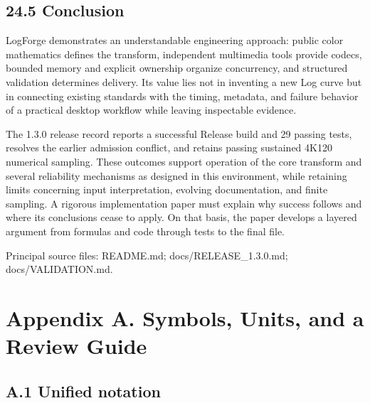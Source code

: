 \documentclass[11pt,a4paper,openany]{book}
\begin{document}
\section*{24.5 Conclusion}
LogForge demonstrates an understandable engineering approach: public color mathematics defines the transform, independent multimedia tools provide codecs, bounded memory and explicit ownership organize concurrency, and structured validation determines delivery. Its value lies not in inventing a new Log curve but in connecting existing standards with the timing, metadata, and failure behavior of a practical desktop workflow while leaving inspectable evidence.

The 1.3.0 release record reports a successful Release build and 29 passing tests, resolves the earlier admission conflict, and retains passing sustained 4K120 numerical sampling. These outcomes support operation of the core transform and several reliability mechanisms as designed in this environment, while retaining limits concerning input interpretation, evolving documentation, and finite sampling. A rigorous implementation paper must explain why success follows and where its conclusions cease to apply. On that basis, the paper develops a layered argument from formulas and code through tests to the final file.


\par\small Principal source files: README.md; docs/RELEASE\_1.3.0.md; docs/VALIDATION.md.\normalsize

\chapter*{Appendix A. Symbols, Units, and a Review Guide}

\section*{A.1 Unified notation}
\end{document}
